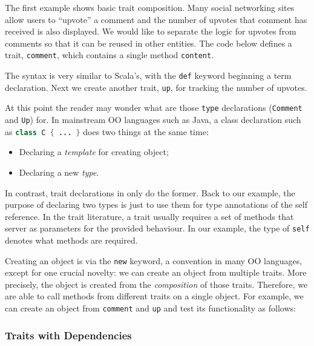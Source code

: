 The first example shows basic trait composition. Many social networking sites
allow users to ``upvote'' a comment and the number of upvotes that comment has
received is also displayed. We would like to separate the logic for upvotes from
comments so that it can be reused in other entities. The code below defines a
trait, \lstinline$comment$, which contains a single method \lstinline$content$.


The syntax is very similar to Scala's, with the \lstinline{def} keyword
beginning a term declaration. Next we create another trait, \lstinline$up$, for
tracking the number of upvotes.


At this point the reader may wonder what are those \lstinline{type} declarations
(\lstinline$Comment$ and \lstinline$Up$) for. In mainstream OO languages such as
Java, a class declaration such as \lstinline[language=java]$class C { ... }$ does two things at
the same time:

\begin{itemize}
\item Declaring a \textit{template} for creating object;
\item Declaring a new \textit{type}.
\end{itemize}

In contrast, trait declarations in \name only do the former. Back to our
example, the purpose of declaring two types is just to use them for type
annotations of the self reference. In the trait literature, a trait usually
requires a set of methods that server as parameters for the provided behaviour.
In our example, the type of \lstinline$self$ denotes what methods are required.

Creating an object is via the \lstinline{new} keyword, a convention in many OO
languages, except for one crucial novelty: we can create an object from multiple
traits. More precisely, the object is created from the \textit{composition} of
those traits. Therefore, we are able to call methods from different traits on a
single object. For example, we can create an object from \lstinline$comment$ and
\lstinline$up$ and test its functionality as follows:


\subsubsection{Traits with Dependencies}

